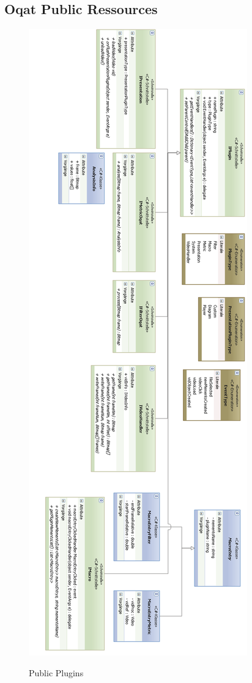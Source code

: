 \subsection{Oqat Public Ressources}
\begin{figure}[h]
\noindent\includegraphics[width=\linewidth,height=\textheight,
keepaspectratio]{bilder/publicPlugins.png}
\label{}
\caption{Public Plugins}
\end{figure}

